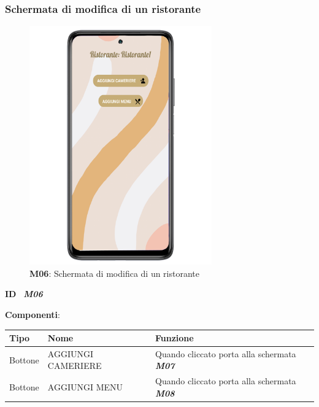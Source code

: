         \subsubsection{Schermata di modifica di un ristorante}
        \begin{figure}[H]
            \centering
            \includegraphics[width=0.70\textwidth]{assets/Mockup/Mockup_ResturantManager.png}
            \caption{\textbf{M06}: Schermata di modifica di un ristorante}
            \label{fig:Mockup_ResturantManager}
        \end{figure}
        \begin{flushleft}
            \textbf{ID} \ \Large{\textit{\textbf{M06}}}
        \end{flushleft}
        \textbf{Componenti}:\\
        \begin{tabular}{lll}
            \hline
            \textbf{Tipo}   &   \textbf{Nome}   &   \textbf{Funzione} \\
            \hline
            Bottone   &   AGGIUNGI CAMERIERE &   Quando cliccato porta alla schermata \textit{\textbf{M07}}\\
            \hline
            Bottone   &   AGGIUNGI MENU &   Quando cliccato porta alla schermata \textit{\textbf{M08}}\\
            \hline
        \end{tabular}
        \newpage
